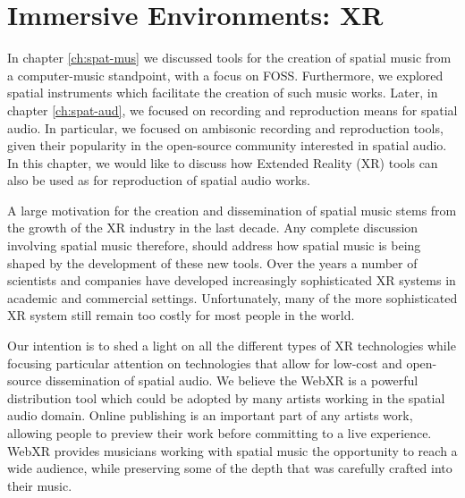 \chapter{Immersive Environments: XR}
\label{ch:xr-mus}


In chapter \ref{ch:spat-mus} we discussed tools for the creation of spatial music from a computer-music standpoint, with a focus on FOSS. Furthermore, we explored spatial instruments which facilitate the creation of such music works. Later, in chapter \ref{ch:spat-aud}, we focused on recording and reproduction means for spatial audio. In particular, we focused on ambisonic recording and reproduction tools, given their popularity in the open-source community interested in spatial audio. In this chapter, we would like to discuss how Extended Reality (XR) tools can also be used as for reproduction of spatial audio works. 

A large motivation for the creation and dissemination of spatial music stems from the growth of the XR industry in the last decade. Any complete discussion involving spatial music therefore, should address how spatial music is being shaped by the development of these new tools. Over the years a number of scientists and companies have developed increasingly sophisticated XR systems in academic and commercial settings. Unfortunately, many of the more sophisticated XR system still remain too costly for most people in the world.

Our intention is to shed a light on all the different types of XR technologies while focusing particular attention on technologies that allow for low-cost and open-source dissemination of spatial audio. We believe the WebXR is a powerful distribution tool which could be adopted by many artists working in the spatial audio domain. Online publishing is an important part of any artists work, allowing people to preview their work before committing to a live experience. WebXR provides musicians working with spatial music the opportunity to reach a wide audience, while preserving some of the depth that was carefully crafted into their music.


